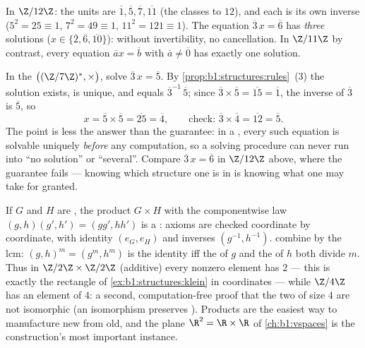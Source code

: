 \begin{example}[Computing in $\Z/n\Z$]\label{ex:b1:structures:zncomputation}
In $\Z/12\Z$: the units are $\overline 1, \overline 5, \overline 7,
\overline{11}$ (the classes  to $12$), and each is its own
inverse ($5^2 = 25 \equiv 1$, $7^2 = 49 \equiv 1$, $11^2 = 121 \equiv
1$). The equation $\overline 3\, x = \overline 6$ has \emph{three}
solutions ($x \in \{\overline 2, \overline 6, \overline{10}\}$):
without invertibility, no cancellation. In $\Z/11\Z$ by contrast,
every equation $\overline a x = \overline b$ with $\overline a \neq
\overline 0$ has exactly one solution.
\end{example}

\begin{example}\label{ex:b1:structures:solving}
In the  $\bigl((\Z/7\Z)^*, \times\bigr)$, solve $\overline
3\,x = \overline 5$. By \cref{prop:b1:structures:rules}~(3) the
solution exists, is unique, and equals $\overline3^{-1}\,
\overline5$; since $\overline3 \times \overline5 = \overline{15}
= \overline1$, the inverse of $\overline 3$ is $\overline 5$, so
\[
x = \overline5 \times \overline5 = \overline{25} = \overline4,
\qquad\text{check: } \overline3 \times \overline4 =
\overline{12} = \overline5 .
\]
The point is less the answer than the guarantee: in a ,
every such equation is solvable uniquely \emph{before} any
computation, so a solving procedure can never run into ``no
solution'' or ``several''. Compare $\overline3\,x = \overline6$
in $\Z/12\Z$ above, where the guarantee fails --- knowing which
structure one is in is knowing what one may take for granted.
\end{example}

\begin{example}\label{ex:b1:structures:product}
If $G$ and $H$ are , the product  $G \times H$ with the
componentwise law $(g, h)(g', h') = (gg', hh')$ is a :
axioms are checked coordinate by coordinate, with identity
$(e_G, e_H)$ and inverses $(g^{-1}, h^{-1})$.  combine by
the lcm: $(g, h)^m = (g^m, h^m)$ is the identity iff the 
of $g$ and the  of $h$ both divide $m$. Thus in $\Z/2\Z
\times \Z/2\Z$ (additive) every nonzero element has  $2$
--- this is exactly the rectangle  of
\cref{ex:b1:structures:klein} in coordinates --- while $\Z/4\Z$
has an element of  $4$: a second, computation-free proof
that the two  of size $4$ are not isomorphic (an
isomorphism preserves ). Products are the easiest way to
manufacture new  from old, and the plane $\R^2 = \R \times
\R$ of \cref{ch:b1:vspaces} is the construction's most important
instance.
\end{example}

